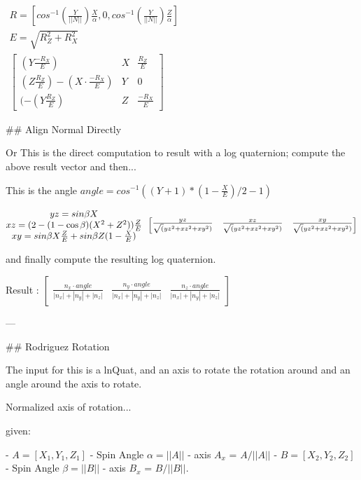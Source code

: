 $\begin{matrix}    R =  [      cos^{-1}( \frac Y {||N||} ) \frac X \alpha, 	0, cos^{-1}( \frac Y {||N||} ) \frac Z \alpha ] \\
	E = \sqrt { R_Z^2+R_X^2 } \\
\begin{bmatrix}
(Y  \frac {-R_X }{ E })&X&\frac {R_Z}{E} \\
 (Z  \frac {R_Z}{E})-(X \cdot \frac {-R_X }{ E } )&Y&0\\
 (-(Y  \frac {R_Z}{E} )&Z&\frac {-R_X }{ E }
\end{bmatrix}
\end{matrix}
$


## Align Normal Directly

Or This is the direct computation to result with a log quaternion; compute the above result vector and then...


This is the angle $angle = cos^{-1} ( ( Y + 1 ) * ( 1 - {\frac X E} ) / 2 - 1 ) $


$\begin{matrix}
        yz = sin \beta X \\
	xz = ( 2 - (1-\cos \beta) (X^2 + Z^2) )  {\frac Z E}\\
	xy = sin \beta  X {\frac Z E}   + sin \beta  Z  (1-{\frac X E})
\end{matrix} \\
 \begin{bmatrix}
                            \frac{yz}{\sqrt(yz^2 + xz^2 + xy^2)} &
							\frac{xz}{\sqrt(yz^2 + xz^2 + xy^2)} &
							\frac{xy}{\sqrt(yz^2 + xz^2 + xy^2)}
\end{bmatrix}                            
$

and finally compute the resulting log quaternion.

Result : $\begin{bmatrix}
  \frac{n_x \cdot angle}{|n_x| + |n_y| + |n_z| }&
  \frac{n_y \cdot angle}{|n_x| + |n_y| + |n_z| }&
  \frac{n_z \cdot angle}{|n_x| + |n_y| + |n_z| }
\end{bmatrix} $

---

## Rodriguez Rotation

The input for this is a lnQuat, and an axis to rotate the rotation around and an angle around the axis to rotate.

Normalized axis of rotation...

given: 

- ${A} = [X_1, Y_1 ,Z_1] $   
  - Spin Angle $\alpha = ||A||$
  - axis $A_x$ = $A/||A||$
- ${B} = [X_2, Y_2 ,Z_2] $  
  - Spin Angle $\beta = ||B||$
  - axis $B_x$ = $B/||B||$.

